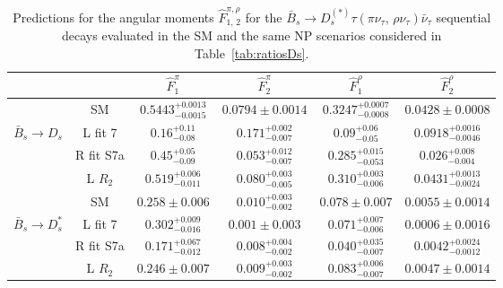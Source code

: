 \documentclass[aps,superscriptaddress,showpacs,nofootinbib,11pt]{revtex4-1}
\newcommand\tstrut{\rule{0pt}{2.9ex}}       %
\begin{document}
%
%
\begin{table}[t]
\begin{center}
\begin{tabular}{c|c|cc|cc}\hline\hline\tstrut
&& $\widehat F_{1}^\pi$&$\widehat F_{2}^\pi$
&$\widehat F_{1}^\rho$&$\widehat F_{2}^\rho$\\ \hline \tstrut
&SM &$0.5443^{+0.0013}_{-0.0015}$&$0.0794\pm0.0014$
&$0.3247^{+0.0007}_{-0.0008}$&$0.0428\pm0.0008$\\ \tstrut
$\bar B_s\to D_s$&L fit 7&$0.16^{+0.11}_{-0.08}$&$0.171^{+0.002}_{-0.007}$
&$0.09^{+0.06}_{-0.05}$&$0.0918^{+0.0016}_{-0.0046}$\\ \tstrut
&R fit S7a&$0.45^{+0.05}_{-0.09}$&$0.053^{+0.012}_{-0.007}$
&$0.285^{+0.015}_{-0.053}$&$0.026^{+0.008}_{-0.004}$\\\tstrut  
&L $R_2$&$0.519^{+0.006}_{-0.011}$&$0.080^{+0.003}_{-0.005}$
&$0.310^{+0.003}_{-0.006}$&$0.0431^{+0.0013}_{-0.0024}$\\
\hline \tstrut
&SM &$0.258\pm0.006$&$0.010^{+0.003}_{-0.002}$
&$0.078\pm0.007$&$0.0055\pm0.0014$\\ \tstrut
$\bar B_s\to D^*_s$&L fit 7&$0.302^{+0.009}_{-0.016}$&$0.001\pm0.003$
&$0.071^{+0.007}_{-0.006}$&$0.0006\pm0.0016$\\ \tstrut
&R fit S7a&$0.171^{+0.067}_{-0.012}$&$0.008^{+0.004}_{-0.002}$
&$0.040^{+0.035}_{-0.007}$&$0.0042^{+0.0024}_{-0.0012}$\\ \tstrut
&L $R_2$&$0.246\pm0.007$&$0.009^{+0.003}_{-0.002}$
&$0.083^{+0.006}_{-0.007}$&$0.0047\pm0.0014$\\ \hline\hline
\end{tabular}
    \caption{ Predictions for the angular moments $\widehat F^{\pi,\rho}_{1,\,2}$ 
    for the
    $\bar B_s\to D^{(*)}_s\tau(\pi\nu_\tau,\,\rho\nu_\tau)
    \bar\nu_\tau$ sequential decays evaluated in the SM and the same NP scenarios 
    considered in Table~\ref{tab:ratiosDs}.}
   \label{tab:hatfsDsDsstar2}
   \end{center}
\end{table}
\end{document}
